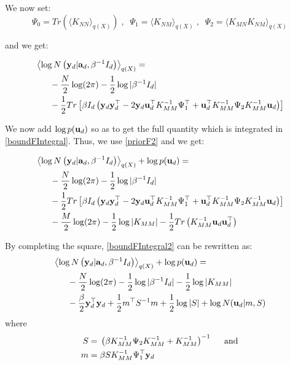 We now set:
\begin{equation*}
\Psi_0 = Tr(\langle \mathit{K_{NN}} \rangle_{q(\mathit{X})}) \;, \;\;
\Psi_1 = \langle \mathit{K_{NM}} \rangle_{q(\mathit{X})} \;, \;\;
\Psi_2 = \langle \mathit{K_{MN}} \mathit{K_{NM}} \rangle_{q(\mathit{X})}
\end{equation*}

and we get:

\begin{align}
{}& \left\langle \log N \left( \mathbf{y}_d | \mathbf{a}_d, \beta^{-1} I_d \right) \right\rangle_{q(X)} = \nonumber \\
{}& \;\;\;\;\;\;
	 - \frac{N}{2} \log (2 \pi) - \frac{1}{2} \log \vert \beta^{-1} I_d \vert \nonumber \\
{}& \;\;\;\;\;\; 
	- \frac{1}{2} Tr \left[
	\beta I_d \left( \mathbf{y}_d \mathbf{y}_d^{\top} - 2 \mathbf{y}_d \mathbf{u}_d^{\top} K_{MM}^{-1} \Psi_1^{\top} + 
	\mathbf{u}_d^{\top} K_{MM}^{-1} \Psi_2 K_{MM}^{-1} \mathbf{u}_d \right) \right]
\end{align}

We now add $\log p(\mathbf{u}_d)$ so as to get the full quantity which is integrated in \eqref{boundFIntegral}. Thus, we use \eqref{priorF2} and we get:

\begin{align}
{}& \left\langle \log N \left( \mathbf{y}_d | \mathbf{a}_d, \beta^{-1} I_d \right) \right\rangle_{q(X)} + \log p(\mathbf{u}_d) = \nonumber \\
{}& \;\;\;\;\;\;
	 - \frac{N}{2} \log (2 \pi) - \frac{1}{2} \log \vert \beta^{-1} I_d \vert \nonumber \\
{}& \;\;\;\;\;\; 
	- \frac{1}{2} Tr \left[
	\beta I_d \left( \mathbf{y}_d \mathbf{y}_d^{\top} - 2 \mathbf{y}_d \mathbf{u}_d^{\top} K_{MM}^{-1} \Psi_1^{\top} + 
	\mathbf{u}_d^{\top} K_{MM}^{-1} \Psi_2 K_{MM}^{-1} \mathbf{u}_d \right) \right] \nonumber \\
{}& \;\;\;\;\;\;
	- \frac{M}{2} \log (2 \pi ) - \frac{1}{2} \log \vert K_{MM} \vert - 
	\frac{1}{2} Tr \left( K_{MM}^{-1} \mathbf{u}_d \mathbf{u}_d^{\top} \right)  \label{boundFIntegral2}
\end{align}

By completing the square, \eqref{boundFIntegral2} can be rewritten as:
\begin{align}
{}& \left\langle \log N \left( \mathbf{y}_d | \mathbf{a}_d, \beta^{-1} I_d \right) \right\rangle_{q(X)} + \log p(\mathbf{u}_d) = \nonumber \\
{}& \;\;\;\;\;\;
  - \frac{N}{2} \log (2 \pi) - \frac{1}{2} \log \vert \beta^{-1} I_d \vert
  - \frac{1}{2} \log \vert K_{MM} \vert \nonumber \\
 {}& \;\;\;\;\;\;
  - \frac{\beta}{2} \mathbf{y}_d^{\top} \mathbf{y}_d + \frac{1}{2} m^{\top} S^{-1} m + \frac{1}{2} \log \vert S \vert
  + \log N(\mathbf{u}_d | m, S) \label{boundFIntegral3}
\end{align}
where
\begin{align}
S = {}& \left( \beta K_{MM}^{-1} \Psi_2 K_{MM}^{-1} + K_{MM}^{-1} \right)^{-1} \label{boundFVarS} \mbox{\;\;\;\; and} \\
m = {}& \beta S K_{MM}^{-1} \Psi_1^{\top} \mathbf{y}_d \label{boundFVarm}
\end{align}

